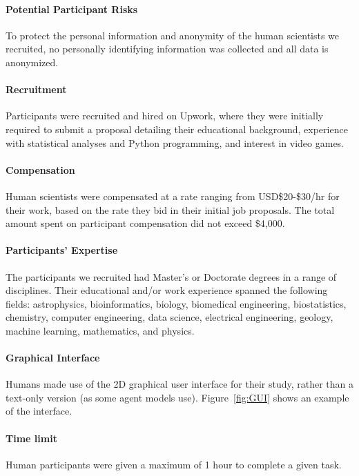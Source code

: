 \documentclass{article}
\begin{document}
\paragraph{Potential Participant Risks} To protect the personal information and anonymity of the human scientists we recruited, no personally identifying information was collected and all data is anonymized.

\paragraph{Recruitment} Participants were recruited and hired on Upwork, where they were initially required to submit a proposal detailing their educational background, experience with statistical analyses and Python programming, and interest in video games. 

\paragraph{Compensation} Human scientists were compensated at a rate ranging from USD\$20-\$30/hr for their work, based on the rate they bid in their initial job proposals. The total amount spent on participant compensation did not exceed \$4,000.

\paragraph{Participants' Expertise} The participants we recruited had Master’s or Doctorate degrees in a range of disciplines. Their educational and/or work experience spanned the following fields: astrophysics, bioinformatics, biology, biomedical engineering, biostatistics, chemistry, computer engineering, data science, electrical engineering, geology, machine learning, mathematics, and physics.

\paragraph{Graphical Interface} Humans made use of the 2D graphical user interface for their study, rather than a text-only version (as some agent models use). Figure~\ref{fig:GUI} shows an example of the interface.

\paragraph{Time limit} Human participants were given a maximum of 1 hour to complete a given task. 
\end{document}
